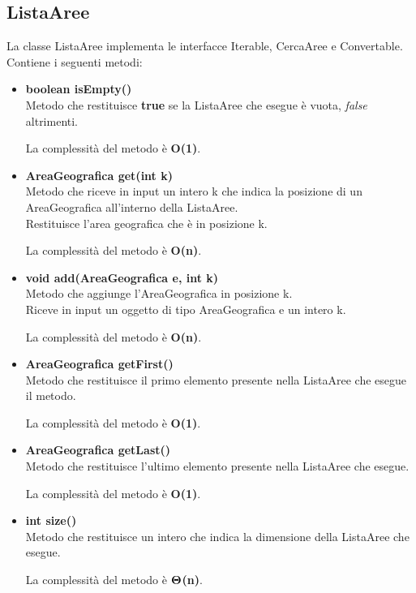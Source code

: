 \documentclass[a4paper, 12pt]{scrreprt}
\begin{document}
			\subsection{ListaAree}
			La classe ListaAree implementa le interfacce Iterable, CercaAree e Convertable. Contiene i seguenti metodi:
			\begin{itemize}
				\item \textbf{boolean isEmpty()}
				\\Metodo che restituisce \textbf{true} se la ListaAree che esegue \`e vuota, \textit{false} altrimenti.
				
				La complessit\`a del metodo è \textbf{O(1)}.
				
				\item \textbf{AreaGeografica get(int k)}
				\\Metodo che riceve in input un intero k che indica la posizione di un AreaGeografica all'interno della ListaAree.
				\\Restituisce l'area geografica che \`e in posizione k.
				
				La complessit\`a del metodo è \textbf{O(n)}.
				
				\item \textbf{void add(AreaGeografica e, int k)}
				\\Metodo che aggiunge l'AreaGeografica in posizione k.
				\\Riceve in input un oggetto di tipo AreaGeografica e un intero k.
				
				La complessit\`a del metodo è \textbf{O(n)}.
				
				\item \textbf{AreaGeografica getFirst()}
				\\Metodo che restituisce il primo elemento presente nella ListaAree che esegue il metodo.
				
				La complessit\`a del metodo è \textbf{O(1)}.
				
				\item \textbf{AreaGeografica getLast()}
				\\Metodo che restituisce l'ultimo elemento presente nella ListaAree che esegue.
				
				La complessit\`a del metodo è \textbf{O(1)}.
				
				\item \textbf{int size()}
				\\Metodo che restituisce un intero che indica la dimensione della ListaAree che esegue.
				
				La complessit\`a del metodo \`e $\mathbf{\Theta}$\textbf{(n)}.
				

\end{itemize}
\end{document}
